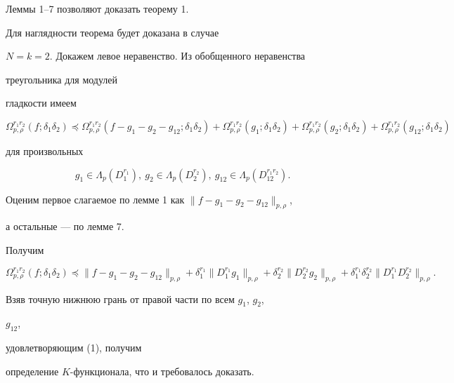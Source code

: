  


Леммы 1--7 позволяют доказать теорему 1. 


Для наглядности теорема будет доказана в случае 


$N=k=2$. Докажем левое неравенство. Из обобщенного неравенства 


треугольника для модулей 


гладкости имеем 


$$ 


\Omega^{r_1r_2}_{p,\rho}(f;\delta_1\delta_2)\preceq 


\Omega^{r_1r_2}_{p,\rho}(f-g_1-g_2-g_{12};\delta_1\delta_2)+ 


\Omega^{r_1r_2}_{p,\rho}(g_1;\delta_1\delta_2)+ 


\Omega^{r_1r_2}_{p,\rho}(g_2;\delta_1\delta_2)+ 


\Omega^{r_1r_2}_{p,\rho}(g_{12};\delta_1\delta_2) 


$$ 


для произвольных 


\begin{equation} 


g_1\in\Lambda_p(D^{r_1}_1),\ g_2\in\Lambda_p(D^{r_2}_2), 


\ g_{12}\in\Lambda_p(D^{r_1r_2}_{12}). 


\end{equation} 


Оценим первое слагаемое по лемме 1 как $\|f-g_1-g_2-g_{12}\|_{p,\rho}$, 


а остальные --- по лемме 7. 


Получим 


$$ 


\Omega^{r_1r_2}_{p,\rho}(f;\delta_1\delta_2)\preceq 


\|f-g_1-g_2-g_{12}\|_{p,\rho}+\delta^{r_1}_1 


\|D^{r_1}_1g_1\|_{p,\rho}+ 


\delta^{r_2}_2\|D^{r_2}_2g_2\|_{p,\rho}+ 


\delta^{r_1}_1\delta^{r_2}_2\|D^{r_1}_1 D^{r_2}_2\|_{p,\rho}. 


$$ 


Взяв точную нижнюю грань от правой части по всем $g_1$, $g_2$, 


$g_{12}$, 


удовлетворяющим (1), получим 


определение $K$-функционала, что и требовалось доказать. 


